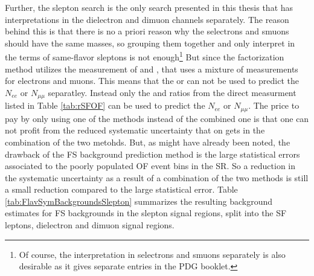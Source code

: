 Further, the slepton search is the only search presented in this thesis that has interpretations in the dielectron and dimuon channels separately. 
The reason behind this is that there is no a priori reason why the selectrons and smuons should have the same masses, so grouping them together and only interpret in the terms of same-flavor sleptons is not enough\footnote{Of course, the interpretation in selectrons and smuons separately is also desirable as it gives separate entries in the PDG booklet. }
But since the factorization method utilizes the measurement of \rmue and \RT, that uses a mixture of measurements for electrons and muons. 
This means that the \rmue or \RT can not be used to predict the $N_{ee}$ or $N_{\mu\mu}$ separatley. 
Instead only the \Reeof and \Rmmof ratios from the direct measurment listed in Table \ref{tab:rSFOF} can be used to predict the $N_{ee}$ or $N_{\mu\mu}$. 
The price to pay by only using one of the methods instead of the combined one is that one can not profit from the reduced systematic uncertainty that on gets in the combination of the two metohds. 
But, as might have already been noted, the drawback of the FS background prediction method is the large statistical errors associated to the poorly populated OF event bins in the SR. 
So a reduction in the systematic uncertainty as a result of a combination of the two methods is still a small reduction compared to the large statistical error. 
Table \ref{tab:FlavSymBackgroundsSlepton} summarizes the resulting background estimates for FS backgrounds in the slepton signal regions, split into the SF leptons, dielectron and dimuon signal regions. 
